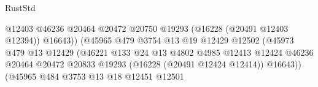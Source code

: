 \begin{lexlean}{RustStd}
\begin{coremodule}
                                                        @12403
                                                        @46236
                                                        @20464
                                                        @20472
                                                        @20750
                                                        @19293
                                                        (@16228 (@20491 @12403 @12394))
                                                        @16643))
                                                    (@45965
                                                      @479
                                                      @3754
                                                      @13
                                                      @19
                                                      @12429
                                                      @12502
                                                      (@45973
                                                        @479
                                                        @13
                                                        @12429
                                                        (@46221
                                                          @133
                                                          @24
                                                          @13
                                                          @4802
                                                          @4985
                                                          @12413
                                                          @12424
                                                          @46236
                                                          @20464
                                                          @20472
                                                          @20833
                                                          @19293
                                                          (@16228 (@20491 @12424 @12414))
                                                          @16643))
                                                      (@45965
                                                        @484
                                                        @3753
                                                        @13
                                                        @18
                                                        @12451
                                                        @12501

\end{coremodule}
\end{lexlean}
